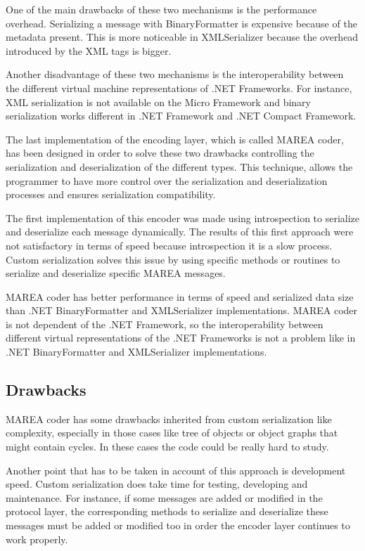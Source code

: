 One of the main drawbacks of these two mechanisms is the performance overhead. Serializing a message with BinaryFormatter is expensive because of the metadata present. This is more noticeable in XMLSerializer because the overhead introduced by the XML tags is bigger. 

Another disadvantage of these two mechanisms is the interoperability between the different virtual machine representations of .NET Frameworks. For instance, XML serialization is not available on the Micro Framework and binary serialization works different in .NET Framework and .NET Compact Framework.

The last implementation of the encoding layer, which is called MAREA coder, has been designed in order to solve these two drawbacks controlling the serialization and deserialization of the different types. This technique, allows the programmer to have more control over the serialization and deserialization processes and ensures serialization compatibility.

The first implementation of this encoder was made using introspection to serialize and deserialize each message dynamically. The results of this first approach were not satisfactory in terms of speed because introspection it is a slow process. Custom serialization solves this issue by using specific methods or routines to serialize and deserialize specific MAREA messages.

MAREA coder has better performance in terms of speed and serialized data size than .NET BinaryFormatter and XMLSerializer implementations. MAREA coder is not dependent of the .NET Framework, so the interoperability between different virtual representations of the .NET Frameworks is not a problem like in .NET BinaryFormatter and XMLSerializer implementations.

\subsection{Drawbacks}\label{SS:Encoding-Layer-Drawbacks}
MAREA coder has some drawbacks inherited from custom serialization like complexity, especially in those cases like tree of objects or object graphs that might contain cycles. In these cases the code could be really hard to study. 

Another point that has to be taken in account of this approach is development speed. Custom serialization does take time for testing, developing and maintenance. For instance, if some messages are added or modified in the protocol layer, the corresponding methods to serialize and deserialize these messages must be added or modified too in order the encoder layer continues to work properly.

